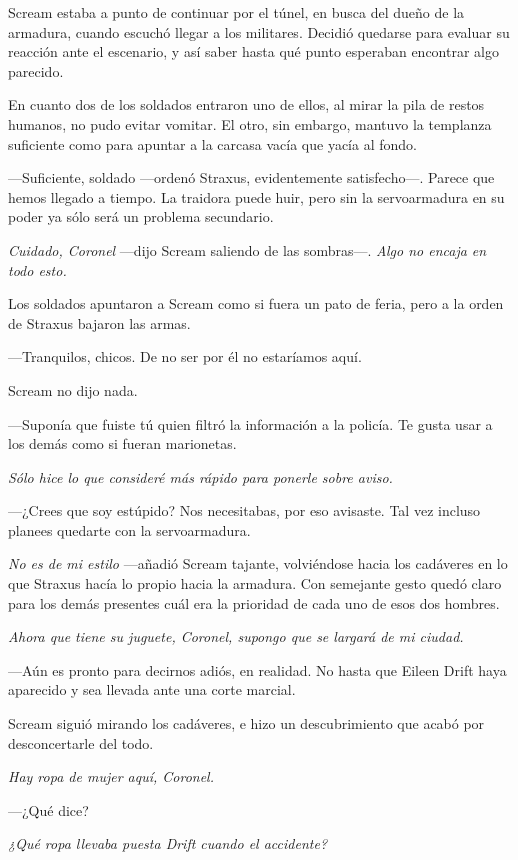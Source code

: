 Scream estaba a punto de continuar por el túnel, en busca del dueño de la armadura, cuando escuchó llegar a los militares. Decidió quedarse para evaluar su reacción ante el escenario, y así saber hasta qué punto esperaban encontrar algo parecido.

En cuanto dos de los soldados entraron uno de ellos, al mirar la pila de restos humanos, no pudo evitar vomitar. El otro, sin embargo, mantuvo la templanza suficiente como para apuntar a la carcasa vacía que yacía al fondo.

---Suficiente, soldado ---ordenó Straxus, evidentemente satisfecho---. Parece que hemos llegado a tiempo. La traidora puede huir, pero sin la servoarmadura en su poder ya sólo será un problema secundario.

\emph{Cuidado, Coronel} ---dijo Scream saliendo de las sombras---. \emph{Algo no encaja en todo esto.}

Los soldados apuntaron a Scream como si fuera un pato de feria, pero a la orden de Straxus bajaron las armas.

---Tranquilos, chicos. De no ser por él no estaríamos aquí.

Scream no dijo nada.

---Suponía que fuiste tú quien filtró la información a la policía. Te gusta usar a los demás como si fueran marionetas.

\emph{Sólo hice lo que consideré más rápido para ponerle sobre aviso.}

---¿Crees que soy estúpido? Nos necesitabas, por eso avisaste. Tal vez incluso planees quedarte con la servoarmadura.

\emph{No es de mi estilo} ---añadió Scream tajante, volviéndose hacia los cadáveres en lo que Straxus hacía lo propio hacia la armadura. Con semejante gesto quedó claro para los demás presentes cuál era la prioridad de cada uno de esos dos hombres.

\emph{Ahora que tiene su juguete, Coronel, supongo que se largará de mi ciudad.}

---Aún es pronto para decirnos adiós, en realidad. No hasta que Eileen Drift haya aparecido y sea llevada ante una corte marcial.

Scream siguió mirando los cadáveres, e hizo un descubrimiento que acabó por desconcertarle del todo.

\emph{Hay ropa de mujer aquí, Coronel.}

---¿Qué dice?

\emph{¿Qué ropa llevaba puesta Drift cuando el accidente?}

